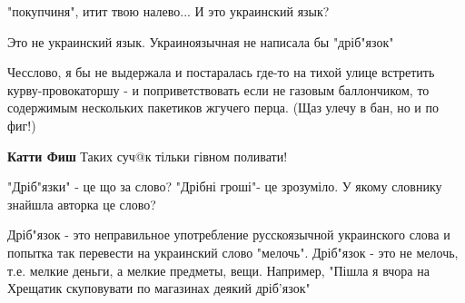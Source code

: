 \begin{itemize}
"покупчиня", итит твою налево... И это украинский язык?

\begin{itemize}
 
Это не украинский язык. Украиноязычная не написала бы "дріб"язок"
\end{itemize}

 

Чесслово, я бы не выдержала и постаралась где-то на тихой улице встретить
курву-провокаторшу - и поприветствовать если не газовым баллончиком, то
содержимым нескольких пакетиков жгучего перца. (Щаз улечу в бан, но и по фиг!)

\begin{itemize}
 
\textbf{Катти Фиш}
Таких суч@к тільки гівном поливати!
\end{itemize}

 
"Дріб"язки" - це що за слово? "Дрібні гроші"- це зрозуміло. У якому словнику
знайшла авторка це слово?

\begin{itemize}

 

Дріб"язок - это неправильное употребление русскоязычной украинского слова и
попытка так перевести на украинский слово "мелочь". Дріб"язок - это не мелочь,
т.е. мелкие деньги, а мелкие предметы, вещи. Например, "Пішла я вчора на
Хрещатик скуповувати по магазинах деякий дріб'язок"



\end{itemize}
\end{itemize}
